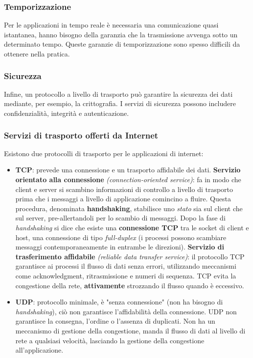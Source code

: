 \subsubsection*{Temporizzazione}
Per le applicazioni in tempo reale è necessaria una comunicazione quasi istantanea, hanno bisogno della garanzia che la trasmissione avvenga sotto un determinato tempo. Queste garanzie di temporizzazione sono spesso difficili da ottenere nella pratica.

\subsubsection*{Sicurezza}
Infine, un protocollo a livello di trasporto può garantire la sicurezza dei dati mediante, per esempio, la crittografia. I servizi di sicurezza possono includere confidenzialità, integrità e autenticazione.

\subsubsection{Servizi di trasporto offerti da Internet}
Esistono due protocolli di trasporto per le applicazioni di internet:
\begin{itemize}
  \item \textbf{TCP}: prevede una connessione e un trasporto affidabile dei dati.
  \textbf{Servizio orientato alla connessione} \textit{(connection-oriented service)}: fa in modo che client e server si scambino informazioni di controllo a livello di trasporto prima che i messaggi a livello di applicazione comincino a fluire. Questa procedura, denominata \textbf{handshaking}, stabilisce uno \textit{stato} sia sul client che sul server, pre-allertandoli per lo scambio di messaggi.
    Dopo la fase di \textit{handshaking} si dice che esiste una \textbf{connessione TCP} tra le socket di client e host, una connessione di tipo \textit{full-duplex} (i processi possono scambiare messaggi contemporaneamente in entrambe le direzioni).
    \textbf{Servizio di trasferimento affidabile} \textit{(reliable data transfer service)}: il protocollo TCP garantisce ai processi il flusso di dati senza errori, utilizzando meccanismi come acknowledgment, ritrasmissione e numeri di sequenza.
    TCP evita la congestione della rete, \textbf{attivamente} strozzando il flusso quando è eccessivo.
  \item \textbf{UDP}: protocollo minimale, è "senza connessione" (non ha bisogno di \textit{handshaking}), ciò non garantisce l'affidabilità della connessione. UDP non garantisce la consegna, l'ordine o l'assenza di duplicati. Non ha un meccanismo di gestione della congestione, manda il flusso di dati al livello di rete a qualsiasi velocità, lasciando la gestione della congestione all'applicazione.
\end{itemize}

